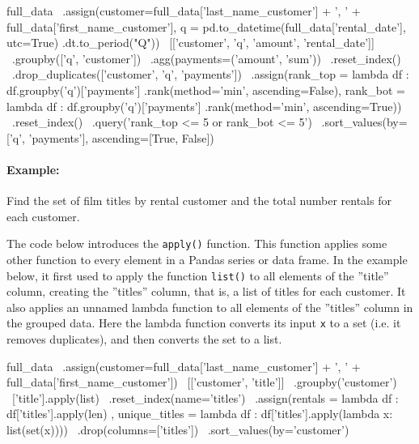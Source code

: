 \begin{pythoncode}
full_data \
   .assign(customer=full_data['last_name_customer'] + ', ' + 
                    full_data['first_name_customer'],
           q = pd.to_datetime(full_data['rental_date'], utc=True)
                 .dt.to_period("Q"))  \
   [['customer', 'q', 'amount', 'rental_date']] \
   .groupby(['q', 'customer']) \
   .agg(payments=('amount', 'sum')) \
   .reset_index() \
   .drop_duplicates(['customer', 'q', 'payments']) \
   .assign(rank_top = lambda df : 
              df.groupby('q')['payments']
                .rank(method='min', ascending=False),
           rank_bot = lambda df : 
              df.groupby('q')['payments']
              .rank(method='min', ascending=True)) \
    .reset_index() \
    .query('rank_top <= 5 or rank_bot <= 5') \
    .sort_values(by=['q', 'payments'], ascending=[True, False]) 
\end{pythoncode}

\paragraph*{Example:} Find the set of film titles by rental customer and the total number rentals for each customer.

The code below introduces the \texttt{apply()} function. This function applies some other function to every element in a Pandas series or data frame. In the example below, it first used to apply the function \texttt{list()} to all elements of the ''title'' column, creating the ''titles'' column, that is, a list of titles for each customer. It also applies an unnamed lambda function to all elements of the ''titles'' column in the grouped data. Here the lambda function converts its input \texttt{x} to a set (i.e. it removes duplicates), and then converts the set to a list.

\begin{pythoncode}
full_data \
   .assign(customer=full_data['last_name_customer'] + ', ' + 
                    full_data['first_name_customer']) \
   [['customer', 'title']] \
   .groupby('customer') \
   ['title'].apply(list) \
   .reset_index(name='titles') \
   .assign(rentals = lambda df :
              df['titles'].apply(len) ,
           unique_titles = lambda df :
              df['titles'].apply(lambda x: list(set(x)))) \
   .drop(columns=['titles']) \
   .sort_values(by='customer')
\end{pythoncode}

